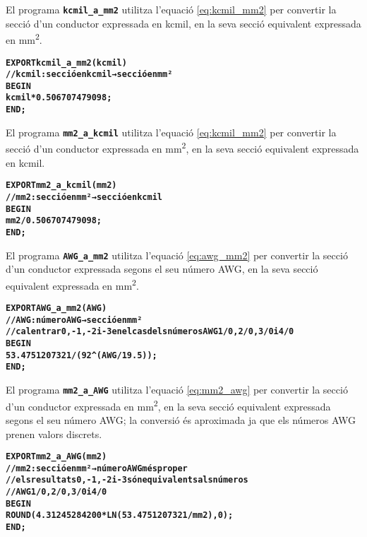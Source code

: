 El programa \texttt{\textbf{kcmil\_a\_mm2}} utilitza l'equació \eqref{eq:kcmil_mm2} per convertir la secció d'un conductor expressada en \si{kcmil}, en la seva secció equivalent expressada en \si{mm^2}.
\vspace{-6mm}
\begin{alltt}
\bfseries
{}
    EXPORT kcmil_a_mm2(kcmil)
    // kcmil:secció en kcmil → secció en mm²
    BEGIN
      kcmil*0.506707479098;
    END;
\end{alltt}

El programa \texttt{\textbf{mm2\_a\_kcmil}} utilitza l'equació \eqref{eq:kcmil_mm2} per convertir la secció d'un conductor expressada en \si{mm^2}, en la seva secció equivalent expressada en \si{kcmil}.
\vspace{-6mm}
\begin{alltt}
\bfseries
{}
    EXPORT mm2_a_kcmil(mm2)
    // mm2:secció en mm² → secció en kcmil
    BEGIN
      mm2/0.506707479098;
    END;
\end{alltt}

El programa \texttt{\textbf{AWG\_a\_mm2}} utilitza l'equació \eqref{eq:awg_mm2} per convertir la secció d'un conductor expressada segons el seu número AWG, en la seva secció equivalent expressada en \si{mm^2}.
\vspace{-6mm}
\begin{alltt}
\bfseries
{}
    EXPORT AWG_a_mm2(AWG)
    // AWG:número AWG → secció en mm²
    // cal entrar 0, -1, -2 i -3 en el cas dels números AWG 1/0, 2/0, 3/0 i 4/0
    BEGIN
      53.4751207321/(92^(AWG/19.5));
    END;
\end{alltt}

El programa \texttt{\textbf{mm2\_a\_AWG}} utilitza l'equació \eqref{eq:mm2_awg} per convertir la secció d'un conductor expressada en \si{mm^2}, en la seva secció equivalent expressada segons el seu número AWG; la conversió és aproximada ja que els números AWG prenen valors discrets.
\vspace{-6mm}
\begin{alltt}
\bfseries
{}
    EXPORT mm2_a_AWG(mm2)
    // mm2:secció en mm² → número AWG més proper
    // els resultats 0, -1, -2 i -3 són equivalents als números
    // AWG 1/0, 2/0, 3/0 i 4/0
    BEGIN
      ROUND(4.31245284200*LN(53.4751207321/mm2),0);
    END;
\end{alltt}


